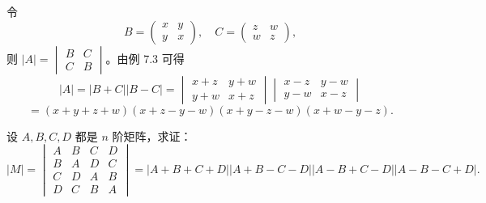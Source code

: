 \documentclass[lang=cn,12pt]{elegantbook}
\begin{document}
\begin{solution}
    令
    \[
    B = 
    \begin{pmatrix}
    x & y \\
    y & x
    \end{pmatrix}, \quad C = 
    \begin{pmatrix}
    z & w \\
    w & z
    \end{pmatrix},
    \]
    则 \(|A| = 
    \begin{vmatrix}
    B & C \\
    C & B
    \end{vmatrix}\)。由例 7.3 可得
    \[
    |A| = |B + C||B - C| = 
    \begin{vmatrix}
    x + z & y + w \\
    y + w & x + z
    \end{vmatrix}
    \begin{vmatrix}
    x - z & y - w \\
    y - w & x - z
    \end{vmatrix}  
    \]
    \[
        = (x + y + z + w)(x + z - y - w)(x + y - z - w)(x + w - y - z).
    \]
\end{solution} 

\begin{example}
    设 \( A, B, C, D \) 都是 \( n \) 阶矩阵，求证：
    \[
    |M| = 
    \begin{vmatrix}
    A & B & C & D \\
    B & A & D & C \\
    C & D & A & B \\
    D & C & B & A
    \end{vmatrix} = |A + B + C + D||A + B - C - D||A - B + C - D||A - B - C + D|.
    \]
    \end{example}
    
\end{document}
